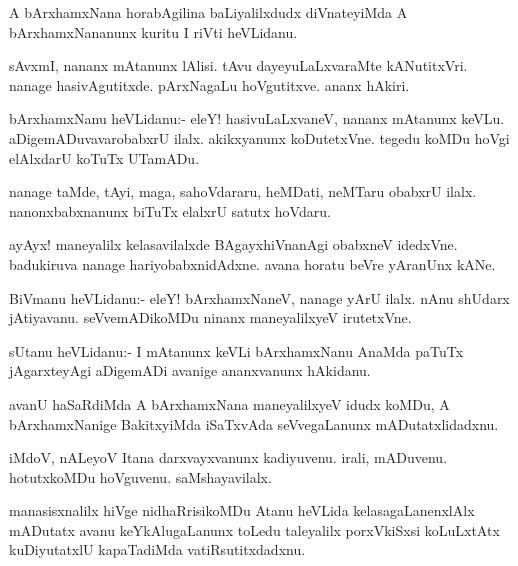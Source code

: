 \begin{mng}
A bArxhamxNana horabAgilina baLiyalilxdudx diVnateyiMda A bArxhamxNananunx kuritu I riVti heVLidanu.
\end{mng}

\begin{mng}
sAvxmI, nananx mAtanunx lAlisi. tAvu dayeyuLaLxvaraMte kANutitxVri. nanage hasivAgutitxde. pArxNagaLu hoVgutitxve. ananx hAkiri.
\end{mng}

\begin{mng}
bArxhamxNanu heVLidanu:- eleY! hasivuLaLxvaneV, nananx mAtanunx keVLu. aDigemADuvavarobabxrU ilalx. akikxyanunx koDutetxVne. tegedu koMDu hoVgi elAlxdarU koTuTx UTamADu.
\end{mng}

\begin{mng}
nanage taMde, tAyi, maga, sahoVdararu, heMDati, neMTaru obabxrU ilalx. nanonxbabxnanunx biTuTx elalxrU satutx hoVdaru.
\end{mng}

\begin{mng}
ayAyx! maneyalilx kelasavilalxde BAgayxhiVnanAgi obabxneV idedxVne. badukiruva nanage hariyobabxnidAdxne. avana horatu beVre yAranUnx kANe.
\end{mng}

\begin{mng}
BiVmanu heVLidanu:- eleY! bArxhamxNaneV, nanage yArU ilalx. nAnu shUdarx jAtiyavanu. seVvemADikoMDu ninanx maneyalilxyeV irutetxVne.
\end{mng}

\begin{mng}
sUtanu heVLidanu:- I mAtanunx keVLi bArxhamxNanu AnaMda paTuTx jAgarxteyAgi aDigemADi avanige ananxvanunx hAkidanu.
\end{mng}

\begin{mng}
avanU haSaRdiMda A bArxhamxNana maneyalilxyeV idudx koMDu, A bArxhamxNanige BakitxyiMda iSaTxvAda seVvegaLanunx mADutatxlidadxnu.
\end{mng}

\begin{mng}
iMdoV, nALeyoV Itana darxvayxvanunx kadiyuvenu. irali, mADuvenu. hotutxkoMDu hoVguvenu. saMshayavilalx.
\end{mng}

\begin{mng}
manasisxnalilx hiVge nidhaRrisikoMDu Atanu heVLida kelasagaLanenxlAlx mADutatx avanu keYkAlugaLanunx toLedu taleyalilx porxVkiSxsi koLuLxtAtx kuDiyutatxlU kapaTadiMda vatiRsutitxdadxnu.
\end{mng}

